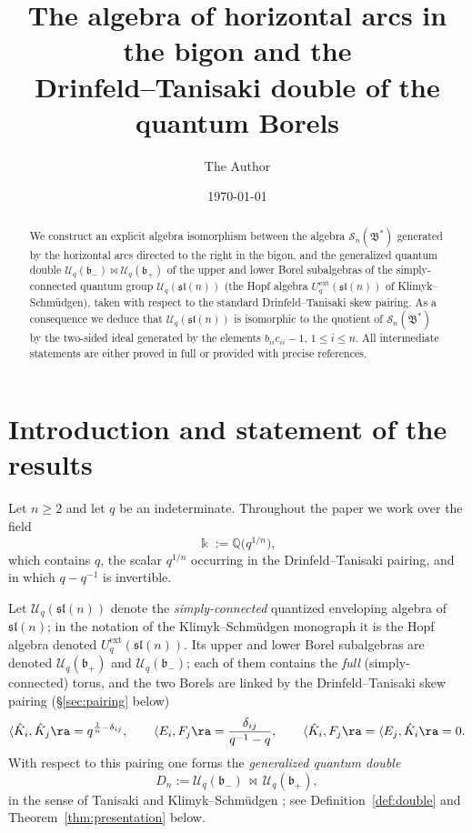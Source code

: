 \documentclass[11pt]{amsart}
\newcommand{\bk}{\Bbbk}
\newcommand{\U}{\mathscr U}
\newcommand{\sl}{\mathfrak{sl}}
\newcommand{\fb}{\mathfrak b}
\newcommand{\la}{\langle}
\theoremstyle{plain}
\theoremstyle{definition}
\numberwithin{equation}{section}
\begin{document}
\title{The algebra of horizontal arcs in the bigon and the\\
Drinfeld--Tanisaki double of the quantum Borels}

\author{The Author}
\date{\today}

\begin{abstract}
We construct an explicit algebra isomorphism between the algebra
$\mathscr S_n(\mathfrak B^*)$ generated by the horizontal arcs directed to the
right in the bigon, and the generalized quantum double
$\U_q(\fb_-)\bowtie \U_q(\fb_+)$ of the upper and lower Borel subalgebras of the
simply-connected quantum group $\U_q(\sl(n))$ (the Hopf algebra
$U_q^{\mathrm{ext}}(\sl(n))$ of Klimyk--Schm\"udgen), taken with respect to the
standard Drinfeld--Tanisaki skew pairing.  As a consequence we deduce that
$\U_q(\sl(n))$ is isomorphic to the quotient of $\mathscr S_n(\mathfrak B^*)$
by the two-sided ideal generated by the elements $b_{ii}c_{ii}-1$,
$1\leq i\leq n$.  All intermediate statements are either proved in full or
provided with precise references.
\end{abstract}

\maketitle

\tableofcontents

\section{Introduction and statement of the results}

Let $n\geq 2$ and let $q$ be an indeterminate.  Throughout the paper we work
over the field
\begin{equation}\label{eq:field}
\bk:=\mathbb Q\big(q^{1/n}\big),
\end{equation}
which contains $q$, the scalar $q^{1/n}$ occurring in the Drinfeld--Tanisaki
pairing, and in which $q-q^{-1}$ is invertible.

Let $\U_q(\sl(n))$ denote the \emph{simply-connected} quantized enveloping
algebra of $\sl(n)$; in the notation of the Klimyk--Schm\"udgen monograph
\cite[Ch.~6]{KS} it is the Hopf algebra denoted $U_q^{\mathrm{ext}}(\sl(n))$.
Its upper and lower Borel subalgebras are denoted $\U_q(\fb_+)$ and
$\U_q(\fb_-)$; each of them contains the \emph{full} (simply-connected) torus,
and the two Borels are linked by the Drinfeld--Tanisaki skew pairing
(\S\ref{sec:pairing} below)
\begin{equation}\label{eq:pairing-intro}
\la \hat K_i,\hat K_j\ra=q^{\frac1n-\delta_{ij}},\qquad
\la E_i,F_j\ra=\frac{\delta_{ij}}{q^{-1}-q},\qquad
\la \hat K_i,F_j\ra=\la E_j,\hat K_i\ra=0 .
\end{equation}
With respect to this pairing one forms the \emph{generalized quantum double}
\[
D_n:=\U_q(\fb_-)\,\bowtie\,\U_q(\fb_+),
\]
in the sense of Tanisaki \cite{Tan} and Klimyk--Schm\"udgen
\cite[\S 8]{KS}; see Definition~\ref{def:double} and
Theorem~\ref{thm:presentation} below.
\end{document}

